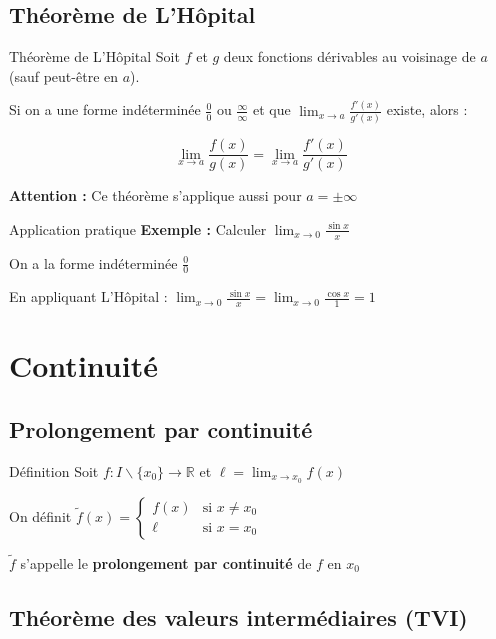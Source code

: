 \documentclass[a4paper,11pt]{article}
\begin{document}
\subsection{Théorème de L'Hôpital}

\begin{theorembox}{Théorème de L'Hôpital}
Soit $f$ et $g$ deux fonctions dérivables au voisinage de $a$ (sauf peut-être en $a$).

Si on a une forme indéterminée $\frac{0}{0}$ ou $\frac{\infty}{\infty}$ et que $\lim_{x \to a} \frac{f'(x)}{g'(x)}$ existe, alors :

\[\lim_{x \to a} \frac{f(x)}{g(x)} = \lim_{x \to a} \frac{f'(x)}{g'(x)}\]

\textbf{Attention :} Ce théorème s'applique aussi pour $a = \pm\infty$
\end{theorembox}

\begin{methodbox}{Application pratique}
\textbf{Exemple :} Calculer $\lim_{x \to 0} \frac{\sin x}{x}$

On a la forme indéterminée $\frac{0}{0}$

En appliquant L'Hôpital : $\lim_{x \to 0} \frac{\sin x}{x} = \lim_{x \to 0} \frac{\cos x}{1} = 1$
\end{methodbox}

\newpage
\section{Continuité}

\subsection{Prolongement par continuité}

\begin{defbox}{Définition}
Soit $f : I \backslash \{x_0\} \to \mathbb{R}$ et $\ell = \lim_{x \to x_0} f(x)$

On définit $\tilde{f}(x) = \begin{cases} f(x) & \text{si } x \neq x_0 \\ \ell & \text{si } x = x_0 \end{cases}$

$\tilde{f}$ s'appelle le \textbf{prolongement par continuité} de $f$ en $x_0$
\end{defbox}

\subsection{Théorème des valeurs intermédiaires (TVI)}
\end{document}
